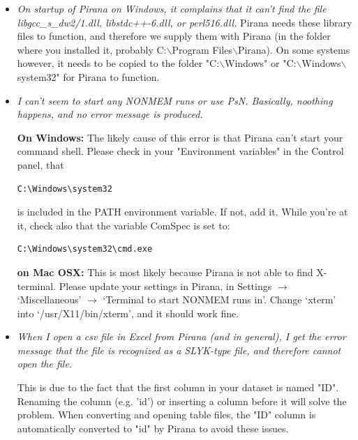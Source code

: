 {{{{\begin{itemize}
  \begin{lstlisting}
  perl -MDBI -e 'print "$DBI::VERSION"'
  perl -MDBD::SQLite -e 'print "$DBD::SQLite::VERSION"'
  \end{lstlisting}

\item \textit{On startup of Pirana on Windows, it complains that it
    can't find the file libgcc\_s\_dw2/1.dll, libstdc++-6.dll, or perl516.dll.}
  Pirana needs these library files to function, and therefore we
  supply them with Pirana (in the folder where you installed it,
  probably C:$\backslash$Program Files$\backslash$Pirana). On some
  systems however, it needs to be copied to the folder
  "C:$\backslash$Windows" or
  "C:$\backslash$Windows$\backslash$system32" for Pirana to
  function.

\item \textit{I can't seem to start any NONMEM runs or use PsN. Basically, noothing happens, and no error message is produced.}

 \vspace{5pt} \textbf{On Windows:} The likely cause of this error is that Pirana can't start
your command shell. Please check in your "Environment variables" in
the Control panel, that

\begin{lstlisting}
C:\Windows\system32
\end{lstlisting}

is included in the PATH
environment variable. If not, add it. While you're at it, check also
that the variable ComSpec is set to:

\begin{lstlisting}
C:\Windows\system32\cmd.exe
\end{lstlisting}

 \vspace{5pt} \textbf{on Mac OSX:} This is most likely because Pirana is not able to find X-terminal. Please update your settings in Pirana, in Settings
 $\rightarrow$ `Miscellaneous'  $\rightarrow$ `Terminal to start NONMEM runs in'. Change `xterm' into `/usr/X11/bin/xterm', and it should work fine.

\item \textit{When I open a csv file in Excel from Pirana (and in
    general), I get the error message that the file is recognized as a
    SLYK-type file, and
    therefore cannot open the file.}

  \vspace{5pt}
  This is due to the fact that the first column in your dataset is
  named "ID". Renaming the column (e.g. 'id') or inserting a column
  before it will solve the problem. When converting and opening table
  files, the "ID" column is automatically converted to "id" by Pirana
  to avoid these issues.


\end{itemize}}}}}
